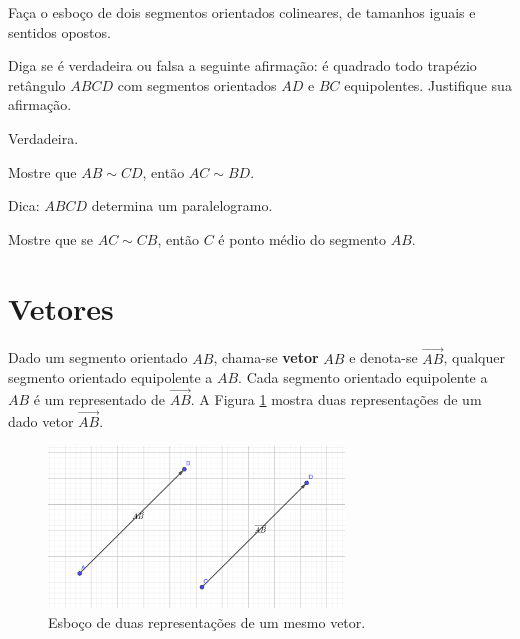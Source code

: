 \begin{exer}
  Faça o esboço de dois segmentos orientados colineares, de tamanhos iguais e sentidos opostos.
\end{exer}

\begin{exer}
  Diga se é verdadeira ou falsa a seguinte afirmação: é quadrado todo trapézio retângulo $ABCD$ com segmentos orientados $AD$ e $BC$ equipolentes. Justifique sua afirmação. 
\end{exer}
\begin{resp}
  Verdadeira.
\end{resp}

\begin{exer}
  Mostre que $AB\sim CD$, então $AC\sim BD$.
\end{exer}
\begin{resp}
  Dica: $ABCD$ determina um paralelogramo.
\end{resp}

\begin{exer}
  Mostre que se $AC\sim CB$, então $C$ é ponto médio do segmento $AB$.
\end{exer}

\section{Vetores}\label{cap_vetor_sec_vetor}

Dado um segmento orientado $AB$, chama-se {\bf vetor} $AB$ e denota-se $\overrightarrow{AB}$, qualquer segmento orientado equipolente a $AB$. Cada segmento orientado equipolente a $AB$ é um representado de $\overrightarrow{AB}$. A Figura \ref{fig:vetor} mostra duas representações de um dado vetor $\overrightarrow{AB}$.

\begin{figure}[h!]
  \centering
  \includegraphics[width=0.7\textwidth]{./cap_vetor/dados/fig_vetor/fig_vetor}
  \caption{Esboço de duas representações de um mesmo vetor.}
  \label{fig:vetor}
\end{figure}


